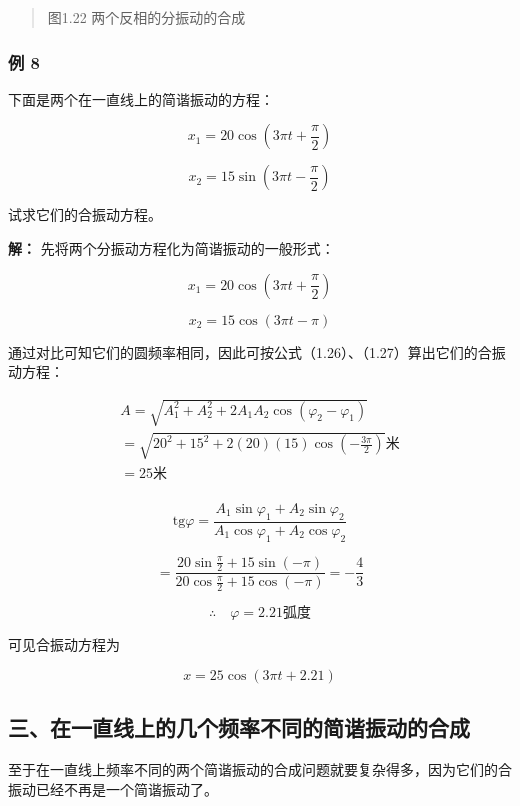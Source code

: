 \begin{quote}
图1.22 两个反相的分振动的合成
\end{quote}

\subsubsection{例 8}\label{ux4f8b-8}

下面是两个在一直线上的简谐振动的方程：

\[
x _ {1} = 20 \cos \left(3 \pi t + \frac {\pi}{2}\right)
\]

\[
x_2=15\sin\left(3\pi t-\frac{\pi}{2}\right)
\]

试求它们的合振动方程。

\textbf{解：} 先将两个分振动方程化为简谐振动的一般形式：

\[
x_1=20\cos\left(3\pi t+\frac{\pi}{2}\right)
\]

\[
x_2=15\cos(3\pi t-\pi)
\]

通过对比可知它们的圆频率相同，因此可按公式（1.26）、（1.27）算出它们的合振动方程：

\[
\begin{array}{l} A = \sqrt {A _ {1} ^ {2} + A _ {2} ^ {2} + 2 A _ {1} A _ {2} \cos (\varphi_ {2} - \varphi_ {1})} \\ = \sqrt {20 ^ {2} + 15 ^ {2} + 2 (20) (15) \cos \left(- \frac {3 \pi}{2}\right)} \text{米} \\ = 25 \text{米} \\ \end{array}
\]

\[
\mathrm{tg} \varphi = \frac {A _ {1} \sin \varphi_ {1} + A _ {2} \sin \varphi_ {2}}{A _ {1} \cos \varphi_ {1} + A _ {2} \cos \varphi_ {2}}
\]

\[
= \frac {20 \sin \frac {\pi}{2} + 15 \sin (- \pi)}{20 \cos \frac {\pi}{2} + 15 \cos (- \pi)} = - \frac {4}{3}
\]

\[
\therefore \quad \varphi = 2.21 \text{弧度}
\]

可见合振动方程为

\[
x=25\cos(3\pi t+2.21)
\]

\subsection{三、在一直线上的几个频率不同的简谐振动的合成}\label{ux4e09ux5728ux4e00ux76f4ux7ebfux4e0aux7684ux51e0ux4e2aux9891ux7387ux4e0dux540cux7684ux7b80ux8c10ux632fux52a8ux7684ux5408ux6210}

至于在一直线上频率不同的两个简谐振动的合成问题就要复杂得多，因为它们的合振动已经不再是一个简谐振动了。

